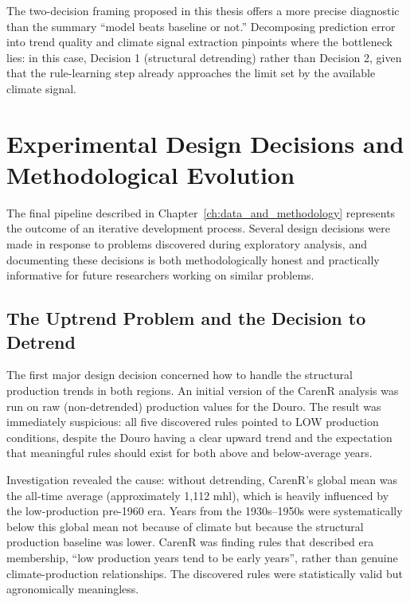 The two-decision framing proposed in this thesis offers a more precise diagnostic than the summary “model beats baseline or not.” Decomposing prediction error into trend quality and climate signal extraction pinpoints where the bottleneck lies: in this case, Decision 1 (structural detrending) rather than Decision 2, given that the rule-learning step already approaches the limit set by the available climate signal.




\section{Experimental Design Decisions and Methodological Evolution}\label{sec:experimental_design_decisions_and}

The final pipeline described in Chapter~\ref{ch:data_and_methodology} represents the outcome of an iterative development process. Several design decisions were made in response to problems discovered during exploratory analysis, and documenting these decisions is both methodologically honest and practically informative for future researchers working on similar problems.


\subsection{The Uptrend Problem and the Decision to Detrend}\label{sub:the_uptrend_problem_and}

The first major design decision concerned how to handle the structural production trends in both regions. An initial version of the CarenR analysis was run on raw (non-detrended) production values for the Douro. The result was immediately suspicious: all five discovered rules pointed to LOW production conditions, despite the Douro having a clear upward trend and the expectation that meaningful rules should exist for both above and below-average years.

Investigation revealed the cause: without detrending, CarenR's global mean was the all-time average (approximately 1,112 mhl), which is heavily influenced by the low-production pre-1960 era. Years from the 1930s--1950s were systematically below this global mean not because of climate but because the structural production baseline was lower. CarenR was finding rules that described era membership, ``low production years tend to be early years'', rather than genuine climate-production relationships. The discovered rules were statistically valid but agronomically meaningless.

